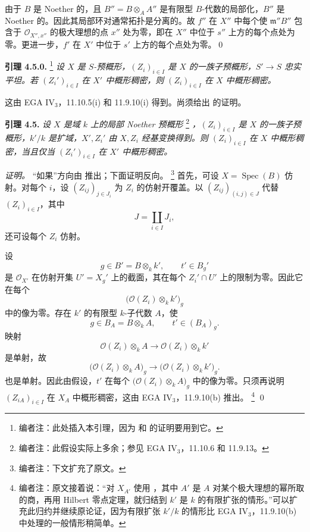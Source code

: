 由于 \(B\) 是 Noether 的，且 \(B''=B\otimes_AA''\) 是有限型 \(B\)-代数的局部化，\(B''\) 是 Noether 的。因此其局部环对通常拓扑是分离的。故 \(f''\) 在 \(X''\) 中每个使 \(\mathfrak m''B''\) 包含于 \(\mathscr O_{X'',x''}\) 的极大理想的点 \(x''\) 处为零，即在 \(X''\) 中位于 \(s''\) 上方的每个点处为零。更进一步，\(f'\) 在 \(X'\) 中位于 \(s'\) 上方的每个点处为零。\qed

\medskip
\noindent{}\textbf{引理 4.5.0.}%
\footnote{编者注：此处插入本引理，因为  和  的证明要用到它。}
\textit{设 \(X\) 是 \(S\)-预概形，\((Z_i)_{i\in I}\) 是 \(X\) 的一族子预概形，\(S'\to S\) 忠实平坦。若 \((Z_i')_{i\in I}\) 在 \(X'\) 中概形稠密，则 \((Z_i)_{i\in I}\) 在 \(X\) 中概形稠密。}

这由 EGA IV\(_3\)，11.10.5(i) 和 11.9.10(i) 得到。尚须给出  的证明。

\medskip
\noindent{}\textbf{引理 4.5.}
\textit{设 \(X\) 是域 \(k\) 上的局部 Noether 预概形}%
\footnote{编者注：此假设实际上多余；参见 EGA IV\(_3\)，11.10.6 和 11.9.13。}
\textit{，\((Z_i)_{i\in I}\) 是 \(X\) 的一族子预概形，\(k'/k\) 是扩域，\(X',Z_i'\) 由 \(X,Z_i\) 经基变换得到。则 \((Z_i)_{i\in I}\) 在 \(X\) 中概形稠密，当且仅当 \((Z_i')_{i\in I}\) 在 \(X'\) 中概形稠密。}

\emph{证明。}
“如果”方向由  推出；下面证明反向。%
\footnote{编者注：下文扩充了原文。}
首先，可设 \(X=\operatorname{Spec}(B)\) 仿射。对每个 \(i\)，设 \((Z_{ij})_{j\in J_i}\) 为 \(Z_i\) 的仿射开覆盖。以
\((Z_{ij})_{(i,j)\in J}\)
代替 \((Z_i)_{i\in I}\)，其中
\[
  J=\coprod_{i\in I}J_i,
\]
还可设每个 \(Z_i\) 仿射。

设
\[
  g\in B'=B\otimes_kk',
  \qquad
  t'\in B_g'
\]
是 \(\mathscr O_{X'}\) 在仿射开集 \(U'=X_g'\) 上的截面，其在每个 \(Z_i'\cap U'\) 上的限制为零。因此它在每个
\[
  \bigl(\mathscr O(Z_i)\otimes_kk'\bigr)_g
\]
中的像为零。存在 \(k'\) 的有限型 \(k\)-子代数 \(A\)，使
\[
  g\in B_A=B\otimes_kA,
  \qquad
  t'\in(B_A)_g.
\]
映射
\[
  \mathscr O(Z_i)\otimes_kA
  \longrightarrow
  \mathscr O(Z_i)\otimes_kk'
\]
是单射，故
\[
  \bigl(\mathscr O(Z_i)\otimes_kA\bigr)_g
  \longrightarrow
  \bigl(\mathscr O(Z_i)\otimes_kk'\bigr)_g.
\]
也是单射。因此由假设，\(t'\) 在每个 \(\bigl(\mathscr O(Z_i)\otimes_kA\bigr)_g\) 中的像为零。只须再说明 \((Z_{iA})_{i\in I}\) 在 \(X_A\) 中概形稠密，这由 EGA IV\(_3\)，11.9.10(b) 推出。%
\footnote{编者注：原文接着说：“对 \(X_{A'}\) 使用 ，其中 \(A'\) 是 \(A\) 对某个极大理想的幂所取的商，再用 Hilbert 零点定理，就归结到 \(k'\) 是 \(k\) 的有限扩张的情形。”可以扩充此归约并继续原论证，因为有限扩张 \(k'/k\) 的情形比 EGA IV\(_3\)，11.9.10(b) 中处理的一般情形稍简单。}
\qed

